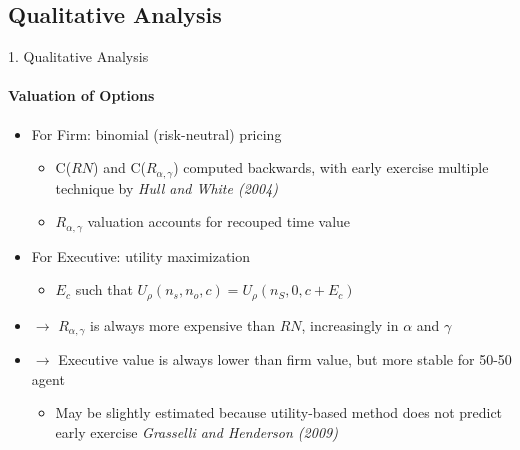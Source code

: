 \documentclass{beamer}
\begin{document}
\subsection{Qualitative Analysis}
\begin{frame}{1. Qualitative Analysis}
    \framesubtitle{Valuation of Options}

    \begin{itemize}
        \item For Firm: binomial (risk-neutral) pricing
        \begin{itemize}
            \item C($RN$) and C($R_{\alpha, \gamma}$) computed backwards, with early exercise multiple technique by \textit{Hull and White (2004)}
            \item $R_{\alpha, \gamma}$ valuation accounts for recouped time value
        \end{itemize}
        \item For Executive: utility maximization
        \begin{itemize}
            \item $E_c$ such that $U_\rho(n_s, n_o, c) = U_\rho(n_S, 0, c + E_c)$
        \end{itemize} 
        \vspace*{5pt}
        \item $\rightarrow$ $R_{\alpha, \gamma}$ is always more expensive than $RN$, increasingly in $\alpha$ and $\gamma$
        \item $\rightarrow$ Executive value is always lower than firm value, but more stable for 50-50 agent
        \begin{itemize}
            \item May be slightly estimated because utility-based method does not predict early exercise \textit{Grasselli and Henderson (2009)}
        \end{itemize}
    \end{itemize}
\end{frame}
\end{document}
